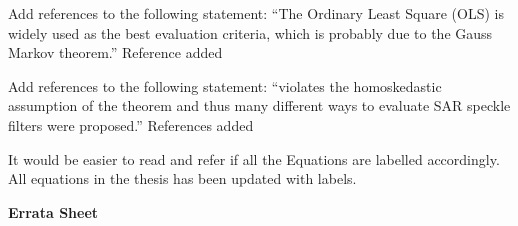 \replyToComment
    {Add references to the following statement: ``The Ordinary Least Square (OLS) is widely used as the best evaluation criteria, which is probably due to the Gauss Markov theorem.''}
    {Reference added \cite{Furno_1991_JStatCompSimul}}

\replyToComment
    {Add references to the following statement: ``violates the homoskedastic assumption of the theorem and thus many different ways to evaluate SAR speckle filters were proposed.''}
    {References added \cite{Gagnon_SPIEProc_1997, Argenti_GRSM_2013}}

\replyToComment
    {It would be easier to read and refer if all the Equations are labelled accordingly.}
    {All equations in the thesis has been updated with labels.}


\textbf{Errata Sheet}
    
